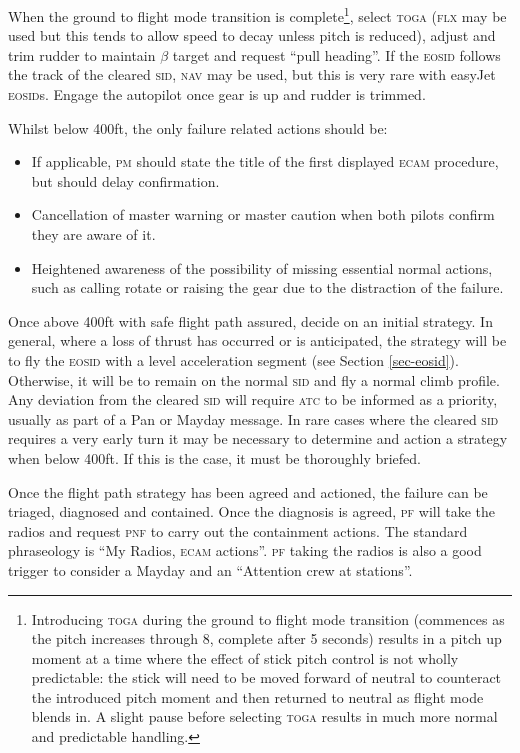 \documentclass[a5paper,11pt,twoside]{book}
\newcommand{\ac}[1]{{\scshape\MakeLowercase{#1}}}
\begin{document}
When the ground to flight mode transition is complete\footnote{Introducing
\ac{TOGA} during the ground to flight mode transition (commences as the pitch
increases through 8\textdegree, complete after 5 seconds) results in a pitch
up moment at a time where the effect of stick pitch control is not wholly
predictable: the stick will need to be moved forward of neutral to counteract
the introduced pitch moment and then returned to neutral as flight mode blends
in. A slight pause before selecting \ac{TOGA} results in much more normal and
predictable handling.}, select \ac{TOGA} (\ac{FLX} may be used but this tends to
allow speed to decay unless pitch is reduced), adjust and trim rudder to
maintain $\beta$ target and request ``pull heading''. If the \ac{EOSID} follows
the track of the cleared \ac{SID}, \ac{NAV} may be used, but this is very rare
with easyJet \ac{EOSID}s.  Engage the autopilot once gear is up and rudder is
trimmed.

Whilst below 400ft, the only failure related actions should be:
\begin{itemize}
\item If applicable, \ac{PM} should state the title of the first displayed
  \ac{ECAM} procedure, but should delay confirmation.

\item Cancellation of master warning or master caution when both pilots confirm
  they are aware of it.

\item Heightened awareness of the possibility of missing essential normal
  actions, such as calling rotate or raising the gear due to the distraction of
  the failure.
\end{itemize}


Once above 400ft with safe flight path assured, decide on an initial
strategy. In general, where a loss of thrust has occurred or is anticipated, the
strategy will be to fly the \ac{EOSID} with a level acceleration segment (see
Section \ref{sec-eosid}). Otherwise, it will be to remain on the normal \ac{SID}
and fly a normal climb profile. Any deviation from the cleared \ac{SID} will
require \ac{ATC} to be informed as a priority, usually as part of a Pan or
Mayday message. In rare cases where the cleared \ac{SID} requires a very early
turn it may be necessary to determine and action a strategy when below 400ft. If
this is the case, it must be thoroughly briefed.

Once the flight path strategy has been agreed and actioned, the failure can be
triaged, diagnosed and contained. Once the diagnosis is agreed, \ac{PF} will
take the radios and request \ac{PNF} to carry out the containment actions. The
standard phraseology is ``My Radios, \ac{ECAM} actions''. \ac{PF} taking the
radios is also a good trigger to consider a Mayday and an ``Attention crew at
stations''.
\end{document}
